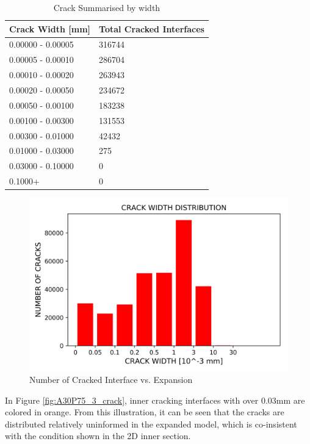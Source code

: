 \begin{table}[!h]
\centering
\begin{tabular}{ |p{4cm}|p{5cm}| }
\hline
 Crack Width [mm] &  Total Cracked Interfaces \\
 \hline\hline

   0.00000 - 0.00005 & 316744 \\
   0.00005 - 0.00010 & 286704 \\
   0.00010 - 0.00020 & 263943 \\
   0.00020 - 0.00050 & 234672 \\
   0.00050 - 0.00100 & 183238 \\
   0.00100 - 0.00300 & 131553 \\
   0.00300 - 0.01000 & 42432 \\
   0.01000 - 0.03000 & 275 \\
   0.03000 - 0.10000 & 0 \\
   0.1000+ & 0 \\

  \hline
  \end{tabular}
\caption{Crack Summarised by width}
\label{table:A30P75_3_Cracks}
\end{table}

\begin{figure}[ht!]
\centering
\includegraphics[width=.8\linewidth]{Files/interface/A30P75_3.png}
  \caption{Number of Cracked Interface vs. Expansion}
  \label{A30P75CR_3}
\end{figure}

In Figure \ref{fig:A30P75_3_crack}, inner cracking interfaces with over 0.03mm are colored in orange. From this illustration, it can be seen that the cracks are distributed relatively uninformed in the expanded model, which is co-insistent with the condition shown in the 2D inner section.
